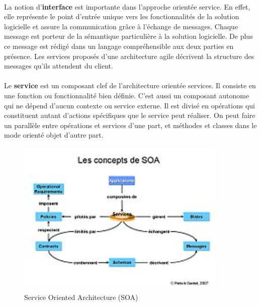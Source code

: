 \documentclass[12pt]{report}
\begin{document}
	      \paragraph{}
		La notion d’\textbf{interface} est importante dans l’approche orientée service. En effet, elle représente le point d’entrée unique vers les fonctionnalités de la solution logicielle et assure la communication grâce à l’échange de messages. Chaque message est porteur de la sémantique particulière à la solution logicielle. De plus ce message est rédigé dans un langage compréhensible aux deux parties en présence. Les services proposés d’une architecture agile décrivent la structure des messages qu’ils attendent du client.
		
	      \paragraph{}
		Le \textbf{service} est un composant clef de l'architecture orientée services. Il consiste en une fonction ou fonctionnalité bien définie. C'est aussi un composant autonome qui ne dépend d’aucun contexte ou service externe. Il est divisé en opérations qui constituent autant d'actions spécifiques que le service peut réaliser. On peut faire un parallèle entre opérations et services d'une part, et méthodes et classes dans le mode orienté objet d'autre part.

	  \begin{figure}[H]
	    \begin{center}
	      \includegraphics[scale=0.6, width=10cm]{images/soa.JPG}
	      \caption{Service Oriented Architecture (SOA)}
	    \end{center}
	  \end{figure} 
      
\end{document}
